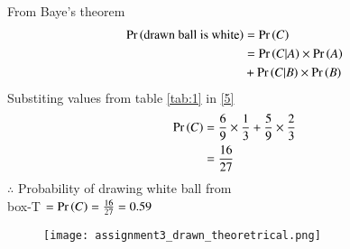 \documentclass[journal,12pt,twocolumn]{IEEEtran}
\begin{document}
From Baye's theorem
\begin{align}
\Pr\left(\text{drawn ball is white}\right)&= \Pr\left(C\right)\\
&=\Pr\left(C|A\right) \times \Pr\left(A\right) \notag \\
 & +\Pr\left(C|B\right) \times \Pr\left(B\right)  \label{5}
\end{align}
Substiting values from table \eqref{tab:1} in \eqref{5}
\begin{align}
\Pr\left(C\right) &= \frac{6}{9} \times \frac{1}{3}  + \frac{5}{9} \times \frac{2}{3} \\
&=\frac{16}{27} \label{6}
\end{align}
$\therefore$ Probability of drawing white ball from\\
 box-T $=\Pr\left(C\right)=\frac{16}{27}=0.59$
\begin{figure}[htb!]
\begin{center}
\texttt{[image: assignment3\_drawn\_theoretrical.png]}
\end{center}
\end{figure}
\end{document}
